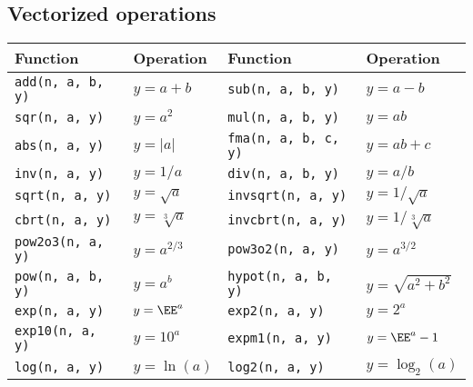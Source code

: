 \subsection{Vectorized operations}
\label{sub:Vectorized operations}

\begin{table}[t]
  \begin{tabu}{X[l]X[l]X[l]X[l]}
    \toprule
    Function & Operation & Function & Operation \\
    \midrule
    \texttt{add(n, a, b, y)}    & $y = a + b$                               &
    \texttt{sub(n, a, b, y)}    & $y = a - b$                               \\
    \texttt{sqr(n, a, y)}       & $y = a^2$                                 &
    \texttt{mul(n, a, b, y)}    & $y = ab$                                  \\
    \texttt{abs(n, a, y)}       & $y = |a|$                                 &
    \texttt{fma(n, a, b, c, y)} & $y = ab + c$                              \\
    \texttt{inv(n, a, y)}       & $y = 1 / a$                               &
    \texttt{div(n, a, b, y)}    & $y = a / b$                               \\
    \texttt{sqrt(n, a, y)}      & $y = \sqrt{a}$                            &
    \texttt{invsqrt(n, a, y)}   & $y = 1 / \sqrt{a}$                        \\
    \texttt{cbrt(n, a, y)}      & $y = \sqrt[3]{a}$                         &
    \texttt{invcbrt(n, a, y)}   & $y = 1 / \sqrt[3]{a}$                     \\
    \texttt{pow2o3(n, a, y)}    & $y = a^{2/3}$                             &
    \texttt{pow3o2(n, a, y)}    & $y = a^{3/2}$                             \\
    \texttt{pow(n, a, b, y)}    & $y = a^b$                                 &
    \texttt{hypot(n, a, b, y)}  & $y = \sqrt{a^2 + b^2}$                    \\
    \texttt{exp(n, a, y)}       & $y = \EE^a$                               &
    \texttt{exp2(n, a, y)}      & $y = 2^a$                                 \\
    \texttt{exp10(n, a, y)}     & $y = 10^a$                                &
    \texttt{expm1(n, a, y)}     & $y = \EE^a - 1$                           \\
    \texttt{log(n, a, y)}       & $y = \ln(a)$                              &
    \texttt{log2(n, a, y)}      & $y = \log_2(a)$                           \\

\end{tabu}
\end{table}
